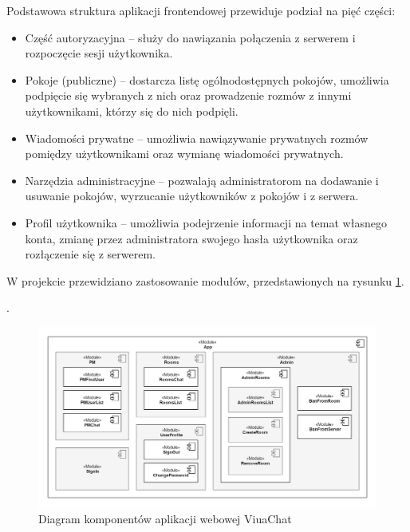 Podstawowa struktura aplikacji frontendowej przewiduje podział na
pięć części:
\begin{itemize}
	\item Część autoryzacyjna -- służy do nawiązania połączenia z
	serwerem i rozpoczęcie sesji użytkownika.

	\item Pokoje (publiczne) -- dostarcza listę ogólnodostępnych pokojów,
	umożliwia podpięcie się wybranych z nich oraz prowadzenie rozmów z
	innymi użytkownikami, którzy się do nich podpięli.

	\item Wiadomości prywatne -- umożliwia nawiązywanie prywatnych
	rozmów pomiędzy użytkownikami oraz wymianę wiadomości prywatnych.

	\item Narzędzia administracyjne -- pozwalają administratorom
	na dodawanie i usuwanie pokojów, wyrzucanie użytkowników z pokojów
	i z serwera.

	\item Profil użytkownika -- umożliwia podejrzenie informacji na
	temat własnego konta, zmianę przez administratora swojego hasła
	użytkownika oraz rozłączenie się z serwerem.

\end{itemize}

W projekcie przewidziano zastosowanie modułów, przedstawionych na rysunku \ref{diag-komp-front}.

.
\begin{figure}[!htp]
	\centering
	\includegraphics[width=\textwidth]{chat/fig/pck-diag-front}
	\caption{Diagram komponentów aplikacji webowej ViuaChat}
	\label{diag-komp-front}
\end{figure}

